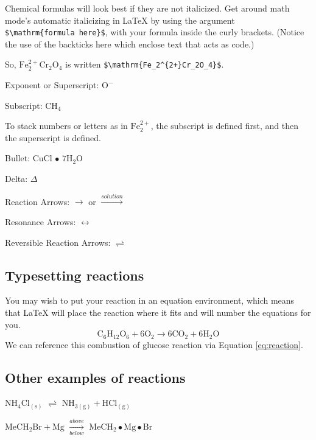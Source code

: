 \documentclass[12pt,twoside]{reedthesis}
\begin{document}
Chemical formulas will look best if they are not italicized. Get around math mode's automatic italicizing in LaTeX by using the argument \texttt{\$\textbackslash{}mathrm\{formula\ here\}\$}, with your formula inside the curly brackets. (Notice the use of the backticks here which enclose text that acts as code.)

So, \(\mathrm{Fe_2^{2+}Cr_2O_4}\) is written \texttt{\$\textbackslash{}mathrm\{Fe\_2\^{}\{2+\}Cr\_2O\_4\}\$}.

\noindent Exponent or Superscript: \(\mathrm{O^-}\)

\noindent Subscript: \(\mathrm{CH_4}\)

To stack numbers or letters as in \(\mathrm{Fe_2^{2+}}\), the subscript is defined first, and then the superscript is defined.

\noindent Bullet: CuCl \(\bullet\) \(\mathrm{7H_{2}O}\)

\noindent Delta: \(\Delta\)

\noindent Reaction Arrows: \(\longrightarrow\) or \(\xrightarrow{solution}\)

\noindent Resonance Arrows: \(\leftrightarrow\)

\noindent Reversible Reaction Arrows: \(\rightleftharpoons\)

\hypertarget{typesetting-reactions}{%
\subsection{Typesetting reactions}\label{typesetting-reactions}}

You may wish to put your reaction in an equation environment, which means that LaTeX will place the reaction where it fits and will number the equations for you.
\begin{equation}
  \mathrm{C_6H_{12}O_6  + 6O_2} \longrightarrow \mathrm{6CO_2 + 6H_2O}
  \label{eq:reaction}
\end{equation}
We can reference this combustion of glucose reaction via Equation \eqref{eq:reaction}.

\hypertarget{other-examples-of-reactions}{%
\subsection{Other examples of reactions}\label{other-examples-of-reactions}}

\(\mathrm{NH_4Cl_{(s)}}\) \(\rightleftharpoons\) \(\mathrm{NH_{3(g)}+HCl_{(g)}}\)

\noindent \(\mathrm{MeCH_2Br + Mg}\) \(\xrightarrow[below]{above}\) \(\mathrm{MeCH_2\bullet Mg \bullet Br}\)
\end{document}
